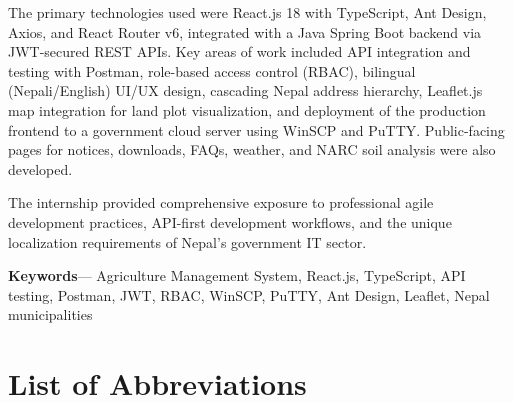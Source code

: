 \documentclass[12pt,a4paper]{report}
\begin{document}
The primary technologies used were React.js 18 with TypeScript, Ant Design, Axios, and
React Router v6, integrated with a Java Spring Boot backend via JWT-secured REST APIs.
Key areas of work included API integration and testing with Postman, role-based access
control (RBAC), bilingual (Nepali/English) UI/UX design, cascading Nepal address
hierarchy, Leaflet.js map integration for land plot visualization, and deployment of the
production frontend to a government cloud server using WinSCP and PuTTY. Public-facing
pages for notices, downloads, FAQs, weather, and NARC soil analysis were also developed.

The internship provided comprehensive exposure to professional agile development
practices, API-first development workflows, and the unique localization requirements of
Nepal's government IT sector.

\textbf{Keywords}--- Agriculture Management System, React.js, TypeScript, API testing,
Postman, JWT, RBAC, WinSCP, PuTTY, Ant Design, Leaflet, Nepal municipalities

\newpage
\tableofcontents
\newpage
\listoffigures
\newpage
\listoftables

\newpage
\chapter*{List of Abbreviations}
\end{document}
